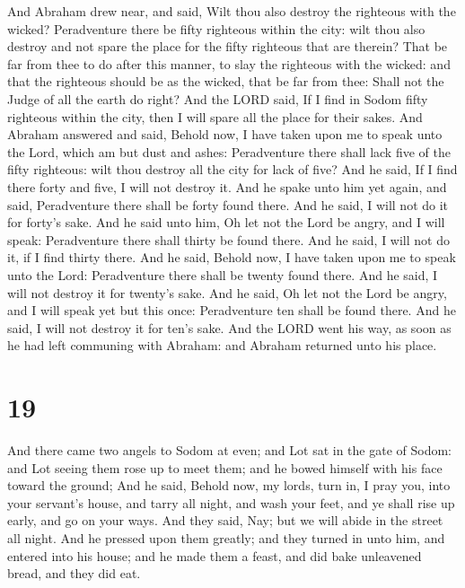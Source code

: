  And Abraham drew near, and said, Wilt thou also destroy
the righteous with the wicked?  Peradventure there be
fifty righteous within the city: wilt thou also destroy and not spare
the place for the fifty righteous that are therein?  That
be far from thee to do after this manner, to slay the righteous with the
wicked: and that the righteous should be as the wicked, that be far from
thee: Shall not the Judge of all the earth do right?  And
the LORD said, If I find in Sodom fifty righteous within the city, then
I will spare all the place for their sakes.  And Abraham
answered and said, Behold now, I have taken upon me to speak unto the
Lord, which am but dust and ashes:  Peradventure there
shall lack five of the fifty righteous: wilt thou destroy all the city
for lack of five? And he said, If I find there forty and five, I will
not destroy it.  And he spake unto him yet again, and
said, Peradventure there shall be forty found there. And he said, I will
not do it for forty's sake.  And he said unto him, Oh let
not the Lord be angry, and I will speak: Peradventure there shall thirty
be found there. And he said, I will not do it, if I find thirty there.
 And he said, Behold now, I have taken upon me to speak
unto the Lord: Peradventure there shall be twenty found there. And he
said, I will not destroy it for twenty's sake.  And he
said, Oh let not the Lord be angry, and I will speak yet but this once:
Peradventure ten shall be found there. And he said, I will not destroy
it for ten's sake.  And the LORD went his way, as soon as
he had left communing with Abraham: and Abraham returned unto his place.

\hypertarget{section-18}{%
\section{19}\label{section-18}}

 And there came two angels to Sodom at even; and Lot sat
in the gate of Sodom: and Lot seeing them rose up to meet them; and he
bowed himself with his face toward the ground;  And he
said, Behold now, my lords, turn in, I pray you, into your servant's
house, and tarry all night, and wash your feet, and ye shall rise up
early, and go on your ways. And they said, Nay; but we will abide in the
street all night.  And he pressed upon them greatly; and
they turned in unto him, and entered into his house; and he made them a
feast, and did bake unleavened bread, and they did eat.

